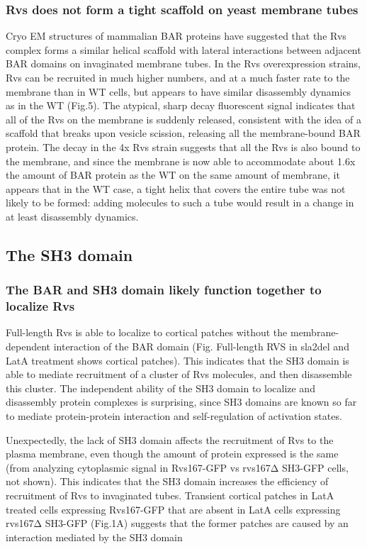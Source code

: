 \subsubsection{Rvs does not form a tight scaffold on yeast membrane tubes}
Cryo EM structures of mammalian BAR proteins have suggested that the Rvs complex forms a similar helical scaffold with lateral interactions between adjacent BAR domains on invaginated membrane tubes. In the Rvs overexpression strains, Rvs can be recruited in much higher numbers, and at a much faster rate to the membrane than in WT cells, but appears to have similar disassembly dynamics as in the WT (Fig.5). The atypical, sharp decay fluorescent signal indicates that all of the Rvs on the membrane is suddenly released, consistent with the idea of a scaffold that breaks upon vesicle scission, releasing all the membrane-bound BAR protein. The decay in the 4x Rvs strain suggests that all the Rvs is also bound to the membrane, and since the membrane is now able to accommodate about 1.6x the amount of BAR protein as the WT on the same amount of membrane, it appears that in the WT case, a tight helix that covers the entire tube was not likely to be formed: adding molecules to such a tube would result in a change in at least disassembly dynamics.


\subsection{The SH3 domain}

	
\subsubsection{The BAR and SH3 domain likely function together to localize Rvs}
Full-length Rvs is able to localize to cortical patches without the membrane-dependent interaction of the BAR domain (Fig. Full-length RVS in sla2del and LatA treatment shows cortical patches). This indicates that the SH3 domain is able to mediate recruitment of a cluster of Rvs molecules, and then disassemble this cluster.  The independent ability of the SH3 domain to localize and disassembly protein complexes is surprising, since SH3 domains are known so far to mediate protein-protein interaction and self-regulation of activation states. 

Unexpectedly, the lack of SH3 domain affects the recruitment of Rvs to the plasma membrane, even though the amount of protein expressed is the same (from analyzing cytoplasmic signal in Rvs167-GFP vs rvs167Δ SH3-GFP cells, not shown). This indicates that the SH3 domain increases the efficiency of recruitment of Rvs to invaginated tubes. Transient cortical patches in LatA treated cells expressing Rvs167-GFP that are absent in LatA cells expressing rvs167Δ SH3-GFP (Fig.1A) suggests that the former patches are caused by an interaction mediated by the SH3 domain

